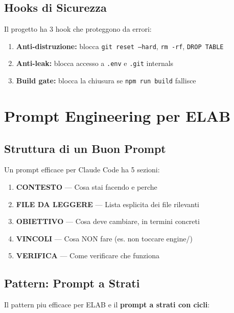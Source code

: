 \documentclass[11pt,a4paper]{article}
\begin{document}
\subsection{Hooks di Sicurezza}

Il progetto ha 3 hook che proteggono da errori:

\begin{enumerate}[leftmargin=2em]
  \item \textbf{Anti-distruzione:} blocca \texttt{git reset --hard}, \texttt{rm -rf}, \texttt{DROP TABLE}
  \item \textbf{Anti-leak:} blocca accesso a \texttt{.env} e \texttt{.git} internals
  \item \textbf{Build gate:} blocca la chiusura se \texttt{npm run build} fallisce
\end{enumerate}

\section{Prompt Engineering per ELAB}

\subsection{Struttura di un Buon Prompt}

\begin{tecnico}
Un prompt efficace per Claude Code ha 5 sezioni:
\begin{enumerate}[leftmargin=2em]
  \item \textbf{CONTESTO} --- Cosa stai facendo e perche
  \item \textbf{FILE DA LEGGERE} --- Lista esplicita dei file rilevanti
  \item \textbf{OBIETTIVO} --- Cosa deve cambiare, in termini concreti
  \item \textbf{VINCOLI} --- Cosa NON fare (es. non toccare engine/)
  \item \textbf{VERIFICA} --- Come verificare che funziona
\end{enumerate}
\end{tecnico}

\subsection{Pattern: Prompt a Strati}

Il pattern piu efficace per ELAB e il \textbf{prompt a strati con cicli}:
\end{document}
